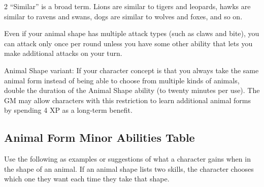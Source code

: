\begin{multicols}{2}
“Similar” is a broad term. Lions are similar to tigers and leopards, hawks are similar to ravens and swans, dogs are similar to wolves and foxes, and so on.

Even if your animal shape has multiple attack types (such as claws and bite), you can attack only once per round unless you have some other ability that lets you make additional attacks on your turn.

Animal Shape variant: If your character concept is that you always take the same animal form instead of being able to choose from multiple kinds of animals, double the duration of the Animal Shape ability (to twenty minutes per use). The GM may allow characters with this restriction to learn additional animal forms by spending 4 XP as a long-term benefit.

\subsection{Animal Form Minor Abilities Table}

Use the following as examples or suggestions of what a character gains when in the shape of an animal. If an animal shape lists two skills, the character chooses which one they want each time they take that shape.

\end{multicols}

